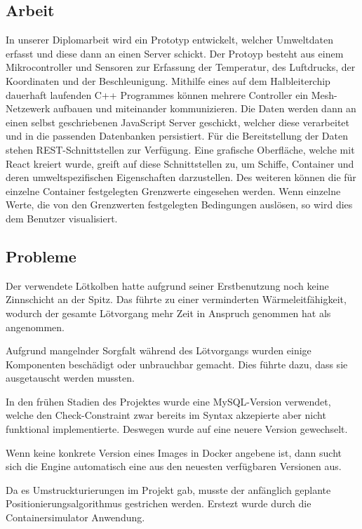 \documentclass[
    headings=optiontotocandhead,%
    twoside,
    numbers=noenddot,%
    12pt, %
    titlepage, %
    parskip=full, %
    listof=leveldown, 
    numbers=noenddot, %
    a4paper,DIV=14,
    BCOR=15mm,
]{scrbook}
\begin{document}
\hypertarget{arbeit}{%
\subsection{Arbeit}\label{arbeit}}

In unserer Diplomarbeit wird ein Prototyp entwickelt, welcher
Umweltdaten erfasst und diese dann an einen Server schickt. Der Protoyp
besteht aus einem Mikrocontroller und Sensoren zur Erfassung der
Temperatur, des Luftdrucks, der Koordinaten und der Beschleunigung.
Mithilfe eines auf dem Halbleiterchip dauerhaft laufenden C++ Programmes
können mehrere Controller ein Mesh-Netzewerk aufbauen und miteinander
kommunizieren. Die Daten werden dann an einen selbst geschriebenen
JavaScript Server geschickt, welcher diese verarbeitet und in die
passenden Datenbanken persistiert. Für die Bereitstellung der Daten
stehen REST-Schnittstellen zur Verfügung. Eine grafische Oberfläche,
welche mit React kreiert wurde, greift auf diese Schnittstellen zu, um
Schiffe, Container und deren umweltspezifischen Eigenschaften
darzustellen. Des weiteren können die für einzelne Container
festgelegten Grenzwerte eingesehen werden. Wenn einzelne Werte, die von
den Grenzwerten festgelegten Bedingungen auslösen, so wird dies dem
Benutzer visualisiert.

\hypertarget{probleme}{%
\subsection{Probleme}\label{probleme}}

Der verwendete Lötkolben hatte aufgrund seiner Erstbenutzung noch keine
Zinnschicht an der Spitz. Das führte zu einer verminderten
Wärmeleitfähigkeit, wodurch der gesamte Lötvorgang mehr Zeit in Anspruch
genommen hat als angenommen.

Aufgrund mangelnder Sorgfalt während des Lötvorgangs wurden einige
Komponenten beschädigt oder unbrauchbar gemacht. Dies führte dazu, dass
sie ausgetauscht werden mussten.

In den frühen Stadien des Projektes wurde eine MySQL-Version verwendet,
welche den Check-Constraint zwar bereits im Syntax akzepierte aber nicht
funktional implementierte. Deswegen wurde auf eine neuere Version
gewechselt.

Wenn keine konkrete Version eines Images in Docker angebene ist, dann
sucht sich die Engine automatisch eine aus den neuesten verfügbaren
Versionen aus.

Da es Umstruckturierungen im Projekt gab, musste der anfänglich geplante
Positionierungsalgorithmus gestrichen werden. Erstezt wurde durch die
Containersimulator Anwendung.
\end{document}
